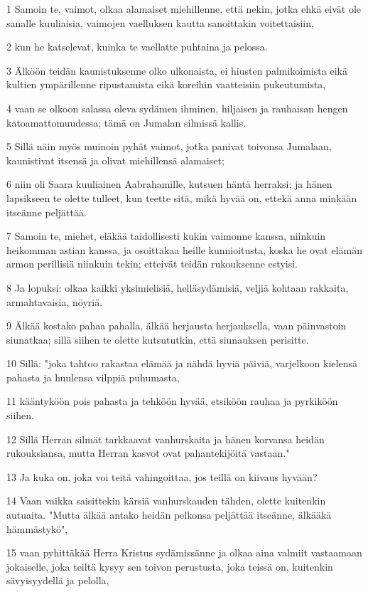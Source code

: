 \par 1 Samoin te, vaimot, olkaa alamaiset miehillenne, että nekin, jotka ehkä eivät ole sanalle kuuliaisia, vaimojen vaelluksen kautta sanoittakin voitettaisiin,
\par 2 kun he katselevat, kuinka te vaellatte puhtaina ja pelossa.
\par 3 Älköön teidän kaunistuksenne olko ulkonaista, ei hiusten palmikoimista eikä kultien ympärillenne ripustamista eikä koreihin vaatteisiin pukeutumista,
\par 4 vaan se olkoon salassa oleva sydämen ihminen, hiljaisen ja rauhaisan hengen katoamattomuudessa; tämä on Jumalan silmissä kallis.
\par 5 Sillä näin myös muinoin pyhät vaimot, jotka panivat toivonsa Jumalaan, kaunistivat itsensä ja olivat miehillensä alamaiset;
\par 6 niin oli Saara kuuliainen Aabrahamille, kutsuen häntä herraksi; ja hänen lapsikseen te olette tulleet, kun teette sitä, mikä hyvää on, ettekä anna minkään itseänne peljättää.
\par 7 Samoin te, miehet, eläkää taidollisesti kukin vaimonne kanssa, niinkuin heikomman astian kanssa, ja osoittakaa heille kunnioitusta, koska he ovat elämän armon perillisiä niinkuin tekin; etteivät teidän rukouksenne estyisi.
\par 8 Ja lopuksi: olkaa kaikki yksimielisiä, helläsydämisiä, veljiä kohtaan rakkaita, armahtavaisia, nöyriä.
\par 9 Älkää kostako pahaa pahalla, älkää herjausta herjauksella, vaan päinvastoin siunatkaa; sillä siihen te olette kutsututkin, että siunauksen perisitte.
\par 10 Sillä: "joka tahtoo rakastaa elämää ja nähdä hyviä päiviä, varjelkoon kielensä pahasta ja huulensa vilppiä puhumasta,
\par 11 kääntyköön pois pahasta ja tehköön hyvää, etsiköön rauhaa ja pyrkiköön siihen.
\par 12 Sillä Herran silmät tarkkaavat vanhurskaita ja hänen korvansa heidän rukouksiansa, mutta Herran kasvot ovat pahantekijöitä vastaan."
\par 13 Ja kuka on, joka voi teitä vahingoittaa, jos teillä on kiivaus hyvään?
\par 14 Vaan vaikka saisittekin kärsiä vanhurskauden tähden, olette kuitenkin autuaita. "Mutta älkää antako heidän pelkonsa peljättää itseänne, älkääkä hämmästykö",
\par 15 vaan pyhittäkää Herra Kristus sydämissänne ja olkaa aina valmiit vastaamaan jokaiselle, joka teiltä kysyy sen toivon perustusta, joka teissä on, kuitenkin sävyisyydellä ja pelolla,
